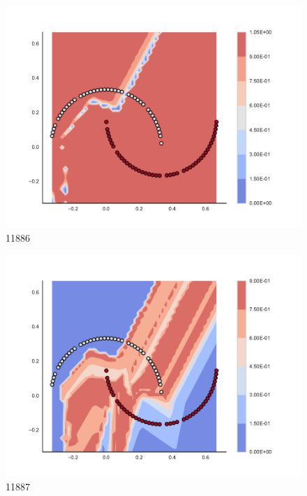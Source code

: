 \begin{subfigure}[b]{0.09\textwidth}
    \includegraphics[clip, trim=2.35cm 1.75cm 4.5cm 0cm,width=\textwidth]{img/convergence/11886.pdf}
    \caption{11886}
    \label{fig:convergence_11886}
\end{subfigure}
%
\begin{subfigure}[b]{0.09\textwidth}
    \includegraphics[clip, trim=2.35cm 1.75cm 4.5cm 0cm,width=\textwidth]{img/convergence/11887.pdf}
    \caption{11887}
    \label{fig:convergence_11887}
\end{subfigure}
%
